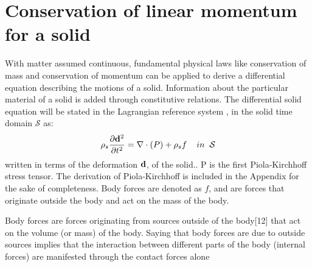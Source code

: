 \section{Conservation of linear momentum for a solid}
With matter assumed continuous, fundamental physical laws like conservation of mass and conservation of momentum can be applied to derive a differential equation describing the motions of a solid. Information about the particular material of a solid is added through constitutive relations.
The differential solid equation will be stated in the Lagrangian reference system \cite{Richter2016}, in the solid time domain $\mathcal{S}$ as:
\begin{equation}\label{eq:Solid}
\rho_s \frac{\partial \bold{d}^2}{\partial t^2} = \nabla \cdot ( P ) + \rho_s f  \hspace{4mm} in \hspace{2mm} \mathcal{S}
\end{equation}
written in terms of the deformation $\bold{d}$, of the solid.. 
P is the first Piola-Kirchhoff stress tensor. The derivation of Piola-Kirchhoff is included in the Appendix for the sake of completeness.
Body forces are denoted as $f$, and are forces that originate outside the body and act on the mass of the body.

Body forces are forces originating from sources outside of the body[12] that act on the volume (or mass) of the body. Saying that body forces are due to outside sources implies that the interaction between different parts of the body (internal forces) are manifested through the contact forces alone


\begin{comment}
\subsection*{Locking}
The problem og shear locking can happen FEM computations with certain elements. 
[mek4250 Kent] - Locking occurs if  $ \lambda >> \nu $ that is, the material is nearly incompressible. The reason is that all the elements discussed in this course are poor at approximating the divergence. Locking refers to the case where the displacement is to small because the divergence term essentially lock the displacement. It is a numerical artifact not a physical feature. [Verbatum]
\end{comment}
